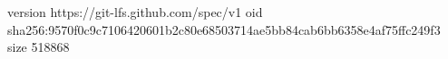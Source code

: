 version https://git-lfs.github.com/spec/v1
oid sha256:9570f0c9c7106420601b2c80e68503714ae5bb84cab6bb6358e4af75ffc249f3
size 518868
